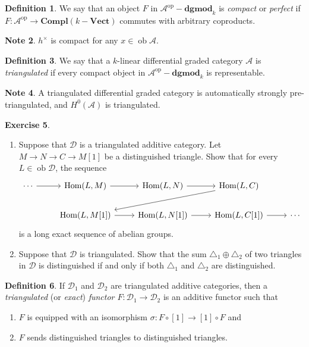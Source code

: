 \documentclass[10pt,letterpaper,cm]{nupset}
\theoremstyle{definition}
\newtheorem{definition}{Definition}[subsection]
\newtheorem{note}[definition]{Note}
\theoremstyle{theorem}
\newtheorem{exercise}[definition]{Exercise}
\theoremstyle{remark}
\newcommand{\A}{\mathcal A}
\newcommand{\1}{\mathbf{1}}
\renewcommand{\a}{\mathscr{A}}
\renewcommand{\d}{\mathscr{D}}
\newcommand{\0}{\vec 0}
\DeclareMathOperator{\op}{op}
\DeclareMathOperator{\ob}{ob}
\DeclareMathOperator{\Hom}{Hom}
\begin{document}
\begin{definition}
We say that an object $F$ in $\a^{\op}{-}\mathbf{dgmod}_k$ is \textit{compact} or \textit{perfect} if $F : \A^{\op} \to \mathbf{Compl}(k{-}\mathbf{Vect})$ commutes with arbitrary coproducts. 
\end{definition}

\begin{note}
$h^{\times}$ is compact for any $x \in \ob{\a}$.
\end{note}

\begin{definition}
We say that a $k$-linear differential graded category $\a$ is \textit{triangulated} if every compact object in $\a^{\op}{-}\mathbf{dgmod}_k$ is representable.
\end{definition}

\begin{note}
A triangulated differential graded category is automatically strongly pre-triangulated, and $H^0(\a)$ is triangulated. 
\end{note}

\begin{exercise} $ $
\begin{enumerate}
\item Suppose that $\d$ is a triangulated additive category.   Let $M \to N \to C \to M[1]$ be a distinguished triangle. Show that for every $L \in \ob{\d}$, the sequence
\[
\begin{tikzcd}
\cdots \arrow[r] & {\Hom(L, M) } \arrow[r]    & {\Hom(L, N)} \arrow[r]    & { \Hom(L, C)} \arrow[lld]  &        \\
                 & { \Hom(L, M[1])} \arrow[r] & {\Hom(L, N[1])} \arrow[r] & {\Hom(L, C[1]) } \arrow[r] & \cdots
\end{tikzcd}
\] is  a long exact sequence of abelian groups. 
\item Suppose that $\d$ is triangulated. Show that the sum $\triangle_1 \oplus \triangle_2$ of two triangles in $\d$ is distinguished if and only if both $\triangle_1$ and $\triangle_2$ are distinguished. 
\end{enumerate}
\end{exercise}

\begin{definition}
If $\d_1$ and $\d_2$ are triangulated additive categories, then a \textit{triangulated} (or \textit{exact}) \textit{functor $F : \d_1 \to \d_2$} is an additive functor such that
\begin{enumerate}[label=(\roman*)]
\item $F$ is equipped with an isomorphism $ \sigma : F \circ [1] \to [1] \circ F$ and
\item $F$ sends distinguished triangles to distinguished triangles.
\end{enumerate}
\end{definition}
\end{document}
